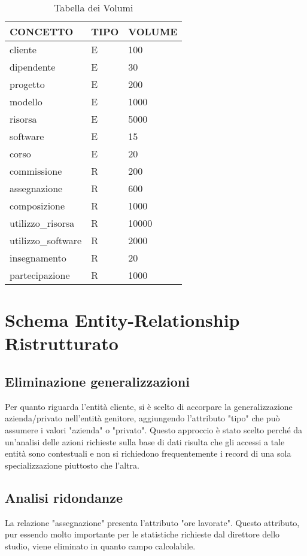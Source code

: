 \documentclass[a4paper,11pt]{article}
\begin{document}
{\begin{table}[h]
\centering
\begin{tabular}{|p{3cm}|p{1.5cm}|p{2cm}|}
\hline
\textbf{CONCETTO} & \textbf{TIPO} & \textbf{VOLUME} \\
\hline
cliente & E & 100 \\
\hline
dipendente & E & 30 \\
\hline
progetto & E & 200 \\
\hline
modello & E & 1000 \\
\hline
risorsa & E & 5000 \\
\hline
software & E & 15 \\
\hline
corso & E & 20 \\
\hline
commissione & R & 200 \\
\hline
assegnazione & R & 600 \\
\hline
composizione & R & 1000 \\
\hline
utilizzo\_risorsa & R & 10000 \\
\hline
utilizzo\_software & R & 2000 \\
\hline
insegnamento & R & 20 \\
\hline
partecipazione & R & 1000 \\
\hline
\end{tabular}
\caption{Tabella dei Volumi}
\end{table}

\section{Schema Entity-Relationship Ristrutturato}
\subsection{Eliminazione generalizzazioni}
Per quanto riguarda l'entità cliente, si è scelto di accorpare la generalizzazione azienda/privato nell'entità genitore, aggiungendo l'attributo "tipo" che può assumere i valori "azienda" o "privato". Questo approccio è stato scelto perché da un'analisi delle azioni richieste sulla base di dati risulta che gli accessi a tale entità sono contestuali e non si richiedono frequentemente i record di una sola specializzazione piuttosto che l'altra.

\subsection{Analisi ridondanze}
La relazione "assegnazione" presenta l'attributo "ore lavorate". Questo attributo, pur essendo molto importante per le statistiche richieste dal direttore dello studio, viene eliminato in quanto campo calcolabile.

}
\end{document}
